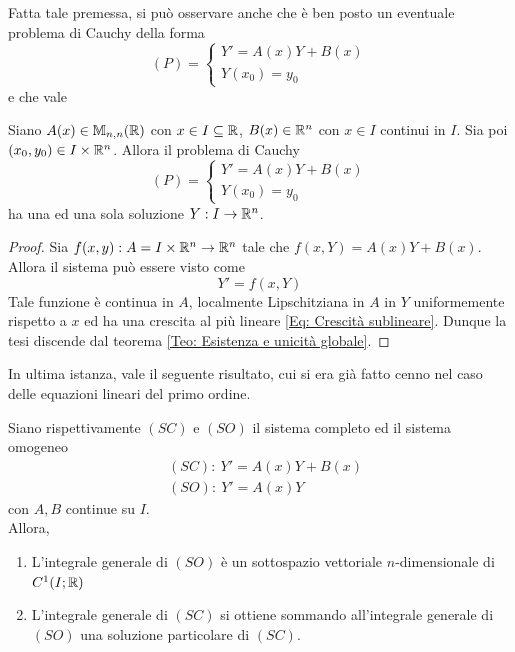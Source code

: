 Fatta tale premessa, si può osservare anche che è ben posto un eventuale problema di Cauchy della forma
\begin{equation}
    (P)=\begin{cases}
        Y'=A(x)Y+B(x)\\
        Y(x_0)=y_0
    \end{cases}
\end{equation}
e che vale
\begin{theorem}
    Siano $A(x) \in \mathbb{M}_{n,n}(\mathbb{R})$ con $x \in I \subseteq \mathbb{R}$, $B(x) \in \mathbb{R}^n$ con $x \in I$ continui in $I$. Sia poi $(x_0, y_0) \in I \times \mathbb{R}^n$. Allora il problema di Cauchy
    \begin{equation}
    (P)=\begin{cases}
        Y'=A(x)Y+B(x)\\
        Y(x_0)=y_0
    \end{cases}
    \end{equation}
    ha una ed una sola soluzione $Y: I \to \mathbb{R}^n$.
\end{theorem}
\begin{proof}
    Sia $f(x,y): A=I \times \mathbb{R}^n \to \mathbb{R}^n$ tale che $f(x,Y)=A(x)Y+B(x)$. Allora il sistema può essere visto come 
    \begin{equation}
        Y'=f(x, Y)
    \end{equation}
    Tale funzione è continua in $A$, localmente Lipschitziana in $A$ in $Y$ uniformemente rispetto a $x$ ed ha una crescita al più lineare \eqref{Eq: Crescità sublineare}. Dunque la tesi discende dal teorema \ref{Teo: Esistenza e unicità globale}.
\end{proof}
In ultima istanza, vale il seguente risultato, cui si era già fatto cenno nel caso delle equazioni lineari del primo ordine.
\begin{theorem} \label{Teo: Struttura dell'integrale generale per i sistemi}
    Siano rispettivamente $(SC)$ e $(SO)$ il sistema completo ed il sistema omogeneo
    \begin{align}
        &(SC):\ Y'=A(x)Y+ B(x)\\
        &(SO):\ Y'=A(x)Y
    \end{align}
    con $A, B$ continue su $I$.\\
    Allora,
    \begin{enumerate}
        \item L'integrale generale di $(SO)$ è un sottospazio vettoriale $n$-dimensionale di $C^1(I; \mathbb{R})$
        \item L'integrale generale di $(SC)$ si ottiene sommando all'integrale generale di $(SO)$ una soluzione particolare di $(SC)$.
    \end{enumerate}
\end{theorem}
